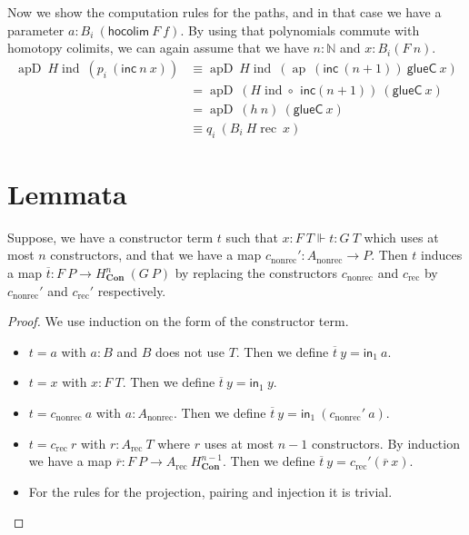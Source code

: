 \documentclass[a4paper,UKenglish]{lipics-v2016}
\newcommand{\Boperator}[1]{\mathsf{#1}}
\newcommand{\inn}{\Boperator{in}}
\newcommand{\comp}[0]{\circ \,}
\newcommand{\frec}[0]{\!\operatorname{rec}}
\newcommand{\ind}[0]{\!\operatorname{ind}}
\newcommand{\rec}[0]{\operatorname{rec}}
\newcommand{\nonrec}[0]{\operatorname{nonrec}}
\newcommand{\ap}[0]{\operatorname{ap}}
\newcommand{\apd}[0]{\operatorname{apD}}
\newcommand{\Con}[0]{\textbf{Con}}
\newcommand{\glueC}[0]{\Boperator{glueC}}
\newcommand{\hocolim}[0]{\Boperator{hocolim}}
\newcommand{\inc}[0]{\Boperator{inc}}
\begin{document}
Now we show the computation rules for the paths, and in that case we have a parameter $a : B_i \> (\hocolim \> F \> f)$.
By using that polynomials commute with homotopy colimits, we can again assume that we have $n : \mathbb{N}$ and $x : B_i(F \> n)$.
\begin{equation*}
\begin{split}
\apd \> H\ind \> (p_i \> (\inc \> n \> x))
&\equiv \apd \> H\ind \> (\ap \> (\inc \> (n+1)) \> \glueC \> x)\\
&= \apd \> (H\ind \comp  \> \inc (n+1)) \> (\glueC \> x)\\
&= \apd \> (h \> n) \> (\glueC \> x)\\
&\equiv q_i \> (B_i \> H\frec \> x)
\end{split}
\end{equation*}


\section{Lemmata}
\label{sec:Lemmata}
\begin{lemma}
\label{lem:constrTerm}
Suppose, we have a constructor term $t$ such that $x : F \> T \Vdash t : G \>T$ which uses at most $n$ constructors, and that we have a map $c_{\nonrec}' : A_{\nonrec} \rightarrow P$.
Then $t$ induces a map $\overline{t} : F \> P \rightarrow H_{\Con}^n \> (G \> P)$ by replacing the constructors $c_{\nonrec}$ and $c_{\rec}$ by $c_{\nonrec}'$ and $c_{\rec}'$ respectively.
\end{lemma}

\begin{proof}
We use induction on the form of the constructor term.
\begin{itemize}
        \item $t = a$ with $a : B$ and $B$ does not use $T$. Then we define $\overline{t} \> y = \inn_1 \> a$.
        \item $t = x$ with $x : F \> T$. Then we define $\overline{t} \> y = \inn_1 \> y$.
        \item $t = c_{\nonrec} \> a$ with $a : A_{\nonrec}$. Then we define $\overline{t} \> y = \inn_1 \> (c_{\nonrec}' \> a)$.
        \item $t = c_{\rec} \> r$ with $r : A_{\rec} \> T$ where $r$ uses at most $n-1$ constructors. 
        By induction we have a map $\overline{r} : F \> P \rightarrow A_{\rec} \> H_{\Con}^{n-1}$.
        Then we define $\overline{t} \> y = c_{\rec}' (\overline{r} \> x)$.
        \item For the rules for the projection, pairing and injection it is trivial. \qedhere
\end{itemize}
\end{proof}
\end{document}
